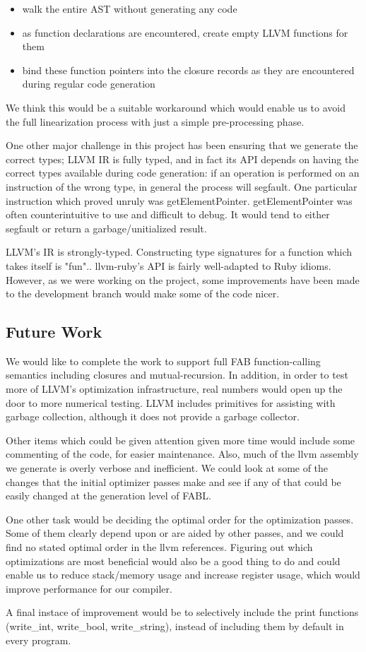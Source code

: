\documentclass[11pt]{article} %
\begin{document}
\begin{itemize}
\item{walk the entire AST without generating any code}
\item{as function declarations are encountered, create empty LLVM functions for them}
\item{bind these function pointers into the closure records as they are encountered during regular code generation}
\end{itemize}

We think this would be a suitable workaround which would enable us to avoid the full linearization process with just a simple pre-processing phase.

One other major challenge in this project has been ensuring that we generate the correct types; LLVM IR is fully typed, and in fact its API depends on having the correct types available during code generation: if an operation is performed on an instruction of the wrong type, in general the process will segfault. One particular instruction which proved unruly was getElementPointer. getElementPointer was often counterintuitive to use and difficult to debug. It would tend to either segfault or return a garbage/unitialized result.

LLVM's IR is strongly-typed. Constructing type signatures for a function which takes itself is "fun".. llvm-ruby's API is fairly well-adapted to Ruby idioms. However, as we were working on the project, some improvements have been made to the development branch would make some of the code nicer.

\subsection{Future Work}

We would like to complete the work to support full FAB function-calling semantics including closures and mutual-recursion. In addition, in order to test more of LLVM's optimization infrastructure, real numbers would open up the door to more numerical testing. LLVM includes primitives for assisting with garbage collection, although it does not provide a garbage collector.

Other items which could be given attention given more time would include some commenting of the code, for easier maintenance. Also, much of the llvm assembly we generate is overly verbose and inefficient. We could look at some of the changes that the initial optimizer passes make and see if any of that could be easily changed at the generation level of FABL.

One other task would be deciding the optimal order for the optimization passes. Some of them clearly depend upon or are aided by other passes, and we could find no stated optimal order in the llvm references. Figuring out which optimizations are most beneficial would also be a good thing to do and could enable us to reduce stack/memory usage and increase register usage, which would improve performance for our compiler.

A final instace of improvement would be to selectively include the print functions (write\_int, write\_bool, write\_string), instead of including them by default in every program.
\end{document}
